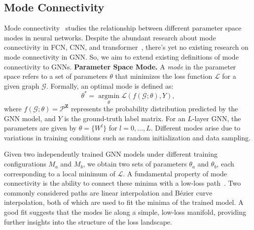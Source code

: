    



\subsection{Mode Connectivity}
\label{sec: mc}

Mode connectivity~\cite{garipov2018loss,draxler2018essentially} studies the relationship between different parameter space modes in neural networks. Despite the abundant research about mode connectivity in FCN, CNN, and transformer~\citep{draxler2018essentially, garipov2018loss, entezari2021role, qin2022exploring}, there's yet no existing research on mode connectivity in GNN. So, we aim to extend existing definitions of mode connectivity to GNNs. 
\noindent\textbf{Parameter Space Mode.}  
A \textit{mode} in the parameter space refers to a set of parameters $\theta$ that minimizes the loss function $\mathcal{L}$ for a given graph $\mathcal{G}$. Formally, an optimal mode is defined as:
\begin{equation}
\theta^* = \operatorname*{argmin}_\theta \mathcal{L}(f(\mathcal{G};\theta), Y),
\end{equation}
where $f(\mathcal{G}; \theta) = \mathcal{P}^{\mathbf{Z}}$ represents the probability distribution predicted by the GNN model, and $Y$ is the ground-truth label matrix. For an \( L \)-layer GNN, the parameters are given by \( \theta = \{W^{l}\} \) for \( l = 0, \dots, L \).
Different modes arise due to variations in training conditions such as random initialization and data sampling.

Given two independently trained GNN models under different training configurations $M_a$ and $M_b$, we obtain two sets of parameters $\theta_a$ and $\theta_b$, each corresponding to a local minimum of $\mathcal{L}$. 
A fundamental property of mode connectivity is the ability to connect these minima with a low-loss path~\citep{draxler2018essentially, garipov2018loss}. Two commonly considered paths are linear interpolation and Bézier curve interpolation, both of which are used to fit the minima of the trained model. A good fit suggests that the modes lie along a simple, low-loss manifold, providing further insights into the structure of the loss landscape.


